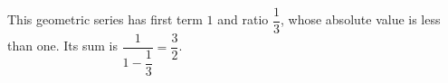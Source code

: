 This geometric series has first term $1$ and ratio $\dfrac{1}{3}$, whose absolute value is less than one. Its sum is $\dfrac{1}{1-\dfrac{1}{3}}=\boxed{\dfrac{3}{2}}$.
